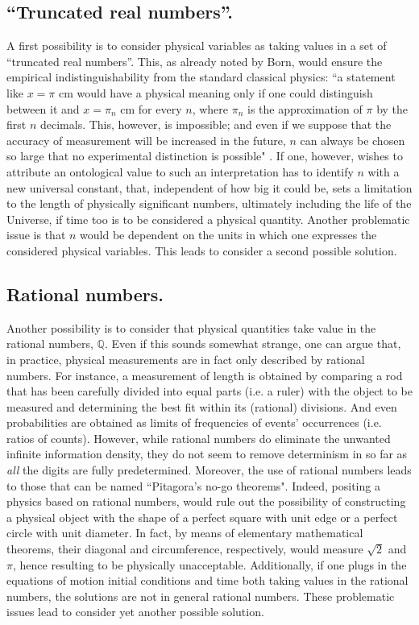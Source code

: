 \documentclass[12pt]{article}
\newcommand{\Q}{\mathbb{Q}}
\begin{document}
\subsection{``Truncated real numbers''.} A first possibility is to consider physical variables as taking values in a set of ``truncated real numbers''. This, as already noted by Born, would ensure the empirical indistinguishability from the standard classical physics: ``a statement like $x = \pi$ cm would have a physical meaning only if one could distinguish between it and $x = \pi_n$ cm for every $n$, where $\pi_n$ is the approximation of $\pi$ by the first $n$ decimals. This, however, is impossible; and even if we suppose that the accuracy of measurement will be increased in the future, $n$ can always be chosen so large that no experimental distinction is possible" \cite{born}. If one, however, wishes to attribute an ontological value to such an interpretation has to identify  $n$ with a new universal constant, that, independent of how big it could be, sets a limitation to the length of physically significant numbers, ultimately including the life of the Universe, if time too is to be considered a physical quantity. Another problematic issue is that $n$ would be dependent on the units in which one expresses the considered physical variables. This leads to consider a second possible solution.

\subsection{Rational numbers.} Another possibility is to consider that physical quantities take value in the rational numbers, $\Q$. Even if this sounds somewhat strange, one can argue that, in practice, physical measurements are in fact only described by rational numbers. For instance, a measurement of length is obtained by comparing a rod that has been carefully divided into equal parts (i.e. a ruler) with the object to be measured and determining the best fit within its (rational) divisions. And even probabilities are obtained as limits of frequencies of events' occurrences  (i.e. ratios of counts). However, while rational numbers do eliminate the unwanted infinite information density, they do not seem to remove determinism in so far as \emph{all} the digits are fully predetermined. Moreover, the use of rational numbers leads to those that can be named ``Pitagora's no-go theorems". Indeed, positing a physics based on rational numbers, would rule out the possibility of constructing a physical object with the shape of a perfect square with unit edge or a perfect circle with unit diameter. In fact, by means of elementary mathematical theorems, their diagonal  and circumference, respectively, would measure $\sqrt2$ and $\pi$, hence resulting to be physically unacceptable.
Additionally, if one plugs in the equations of motion initial conditions and time both taking values in the rational numbers, the solutions are not in general rational numbers.
These problematic issues lead to consider yet another possible solution.
\end{document}
